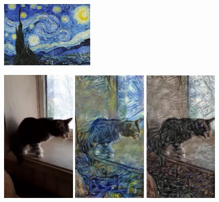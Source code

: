 \begin{figure}[!ht]
\begin{center}
\includegraphics[width=0.4\textwidth]{report/Method/images/style_starry_night.jpg}
\label{fig:starry night}\newline

\includegraphics[width=0.32\textwidth]{report/Method/images/original_cat.png}
\label{original cat}
\includegraphics[width=0.32\textwidth]{report/Method/images/styled_cat.png}
\label{styled cat}
\includegraphics[width=0.32\textwidth]{report/Method/images/color_preserved.png}

\end{center}
\end{figure}
